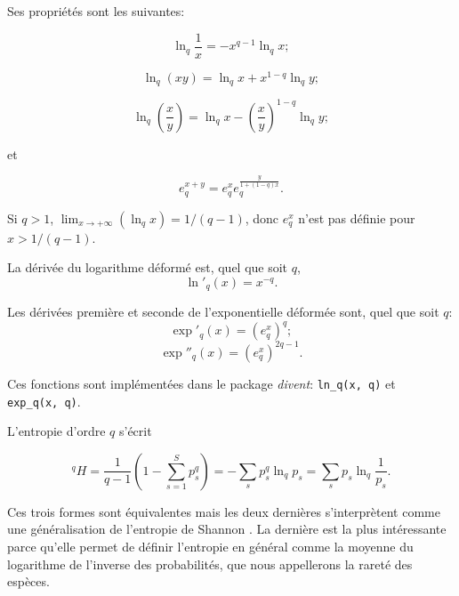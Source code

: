 \documentclass[
  11pt,
  american,
  a4paper,
  extrafontsizes,onecolumn,openright
  ]{memoir}
\begin{document}
Ses propriétés sont les suivantes:

\begin{equation}
  \label{eq:lnqinv}
  \ln_q\frac{1}{x} = -x^{q - 1} \ln_q{x};
\end{equation}

\begin{equation}
  \label{eq:lnqprod}
  \ln_q\left( xy \right) = \ln_q{x} + x^{1-q} \ln_q{y};
\end{equation}

\begin{equation}
  \label{eq:lnqdiv}
  \ln_q\left( \frac{x}{y} \right)
  = \ln_q{x} - {\left( \frac{x}{y} \right)}^{1 - q} \ln_q{y};
\end{equation}

et

\begin{equation}
  \label{eq:expqsum}
  e^{x + y}_q = e_q^x e_q^{\frac{y}{1 + \left( 1 - q \right) x}}.
\end{equation}

Si \(q > 1\), \(\mathop{\lim}_{x \to +\infty}(\ln_q{x}) = {1} / {(q - 1)}\), donc \(e_q^x\) n'est pas définie pour \(x > 1 / (q - 1)\).

La dérivée du logarithme déformé est, quel que soit \(q\),
\begin{equation}
  \label{eq:lnqprime}
  \ln'_q\left( x \right) = x^{-q}.
\end{equation}

Les dérivées première et seconde de l'exponentielle déformée sont, quel que soit \(q\):
\begin{equation}
  \label{eq:expqprime}
  \exp'_q\left( x \right) = \left( e_q^x \right)^{q};
\end{equation}
\begin{equation}
  \label{eq:expqsec}
  \exp''_q\left( x \right) = \left( e_q^x \right)^{2q - 1}.
\end{equation}

Ces fonctions sont implémentées dans le package \emph{divent}: \texttt{ln\_q(x,\ q)} et \texttt{exp\_q(x,\ q)}.

L'entropie d'ordre \(q\) s'écrit

\begin{equation}
  \label{eq:EntropieHCDT}
  ^{q}\!H 
  = \frac{1}{q - 1} \left( 1 - \sum^S_{s=1}{p^q_s} \right)
  = -\sum_s{p^q_s} \ln_q{p_s}
  = \sum_s{p_s}{\ln_q\frac{1}{p_s}}.
\end{equation}

Ces trois formes sont équivalentes mais les deux dernières s'interprètent comme une généralisation de l'entropie de Shannon \autocite{Marcon2014a}.
La dernière est la plus intéressante parce qu'elle permet de définir l'entropie en général comme la moyenne du logarithme de l'inverse des probabilités, que nous appellerons la rareté des espèces.
\end{document}
